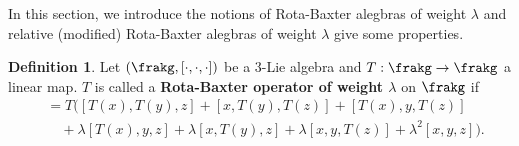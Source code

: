 \documentclass[12pt]{amsart}
\theoremstyle{definition}
\newtheorem{defn}[theorem]{Definition}
\begin{document}
 In this section,  we introduce the notions of  Rota-Baxter alegbras of weight $\lambda$ and relative (modified) Rota-Baxter alegbras of weight $\lambda$  give some properties.

\begin{defn}\cite{BGLW13}
		Let $(\frakg,[\cdot,\cdot,\cdot])$ be a $3$-Lie algebra and
		$T:\frakg\to\frakg$ a linear map.
			$T$ is called a \textbf{Rota-Baxter operator of weight $\lambda$} on $\frakg$ if
			\begin{align*}
				[T(x),T(y),T(z)]
				&=T\Big(
				[T(x),T(y),z]+[x,T(y),T(z)]+[T(x),y,T(z)]  \\
				&\quad +\lambda [T(x),y,z]+\lambda[x,T(y),z]+\lambda[x,y,T(z)]
				+\lambda^{2}[x,y,z]
				\Big).
			\end{align*}
\end{defn}
\end{document}
